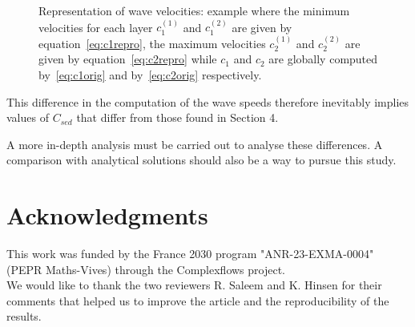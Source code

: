 \begin{figure}[htbp]
    \centering


    \caption{Representation of wave velocities: example where the minimum velocities for each layer $c_1^{(1)}$ and $c_1^{(2)}$ are given by equation~\eqref{eq:c1repro}, the maximum velocities $c_2^{(1)}$ and $c_2^{(2)}$ are given by  equation~\eqref{eq:c2repro} while $c_1$ and $c_2$ are globally computed by~\eqref{eq:c1orig} and by~\eqref{eq:c2orig} respectively.}
    \label{fig:velocities}

\end{figure}

This difference in the computation of the wave speeds therefore inevitably implies values of $C_{sed}$ that differ from those found in Section 4.

A more in-depth analysis must be carried out to analyse these differences. A comparison with analytical solutions should also be a way to pursue this study.


\section*{Acknowledgments}
This work was funded by the France 2030 program "ANR-23-EXMA-0004" (PEPR Maths-Vives) through the Complexflows project.\\
We would like to thank the two reviewers R. Saleem and K. Hinsen for their comments that helped us to improve the article and the reproducibility of the results.
